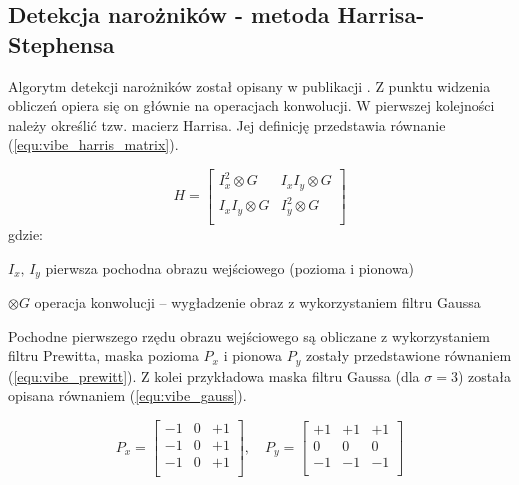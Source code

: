 \subsection{Detekcja narożników - metoda Harrisa-Stephensa}
\label{subsec:vibe_harris}

Algorytm detekcji narożników został opisany w publikacji \cite{harris_88}. 
Z punktu widzenia obliczeń opiera się on głównie na operacjach konwolucji. 
W pierwszej kolejności należy określić tzw. macierz Harrisa. 
Jej definicję przedstawia równanie (\ref{equ:vibe_harris_matrix}).

    \begin{equation}
        H = \begin{bmatrix}
               I_x^2 \otimes G    & I_x I_y \otimes G  \\
               I_x I_y \otimes G  & I_y^2 \otimes G    \\
     \end{bmatrix}
        \label{equ:vibe_harris_matrix}
    \end{equation}
gdzie:
\begin{eqwhere}[2cm]
	\item[$I_x,\, I_y$] pierwsza pochodna obrazu wejściowego (pozioma i pionowa)
	\item[$\otimes G$] operacja konwolucji -- wygładzenie obraz z wykorzystaniem filtru Gaussa
\end{eqwhere}

Pochodne pierwszego rzędu obrazu wejściowego są obliczane z wykorzystaniem filtru Prewitta, maska pozioma $P_x$ i pionowa $P_y$ zostały przedstawione równaniem (\ref{equ:vibe_prewitt}). 
Z kolei przykładowa maska filtru Gaussa (dla $\sigma = 3$) została opisana równaniem (\ref{equ:vibe_gauss}).

    \begin{equation}
        P_x = \begin{bmatrix}
			    -1 & 0 & +1 \\
			    -1 & 0 & +1 \\
			    -1 & 0 & +1 \\
		    \end{bmatrix}
		,\quad 
		P_y= \begin{bmatrix}
			    +1 & +1 & +1 \\
			    0 & 0 & 0 \\
			    -1 & -1 & -1 \\
		    \end{bmatrix}
        \label{equ:vibe_prewitt}
    \end{equation}

